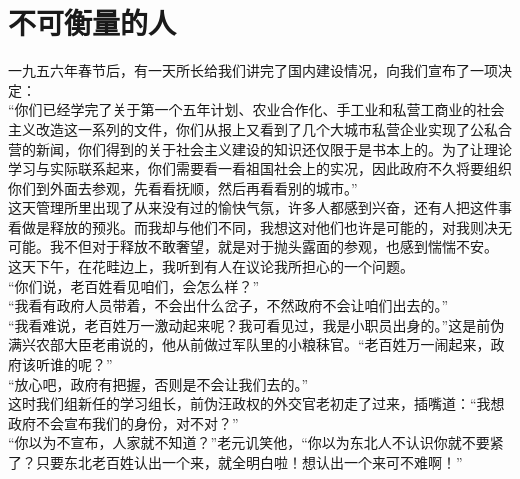 \fancyhead[RO]{\thepage} %
\fancyhead[LE]{\thepage} %
\chapter*{不可衡量的人}
一九五六年春节后，有一天所长给我们讲完了国内建设情况，向我们宣布了一项决定：\\

“你们已经学完了关于第一个五年计划、农业合作化、手工业和私营工商业的社会主义改造这一系列的文件，你们从报上又看到了几个大城市私营企业实现了公私合营的新闻，你们得到的关于社会主义建设的知识还仅限于是书本上的。为了让理论学习与实际联系起来，你们需要看一看祖国社会上的实况，因此政府不久将要组织你们到外面去参观，先看看抚顺，然后再看看别的城市。”\\

这天管理所里出现了从来没有过的愉快气氛，许多人都感到兴奋，还有人把这件事看做是释放的预兆。而我却与他们不同，我想这对他们也许是可能的，对我则决无可能。我不但对于释放不敢奢望，就是对于抛头露面的参观，也感到惴惴不安。\\

这天下午，在花畦边上，我听到有人在议论我所担心的一个问题。\\

“你们说，老百姓看见咱们，会怎么样？”\\

“我看有政府人员带着，不会出什么岔子，不然政府不会让咱们出去的。”\\

“我看难说，老百姓万一激动起来呢？我可看见过，我是小职员出身的。”这是前伪满兴农部大臣老甫说的，他从前做过军队里的小粮秣官。“老百姓万一闹起来，政府该听谁的呢？”\\

“放心吧，政府有把握，否则是不会让我们去的。”\\

这时我们组新任的学习组长，前伪汪政权的外交官老初走了过来，插嘴道：“我想政府不会宣布我们的身份，对不对？”\\

“你以为不宣布，人家就不知道？”老元讥笑他，“你以为东北人不认识你就不要紧了？只要东北老百姓认出一个来，就全明白啦！想认出一个来可不难啊！”\\


